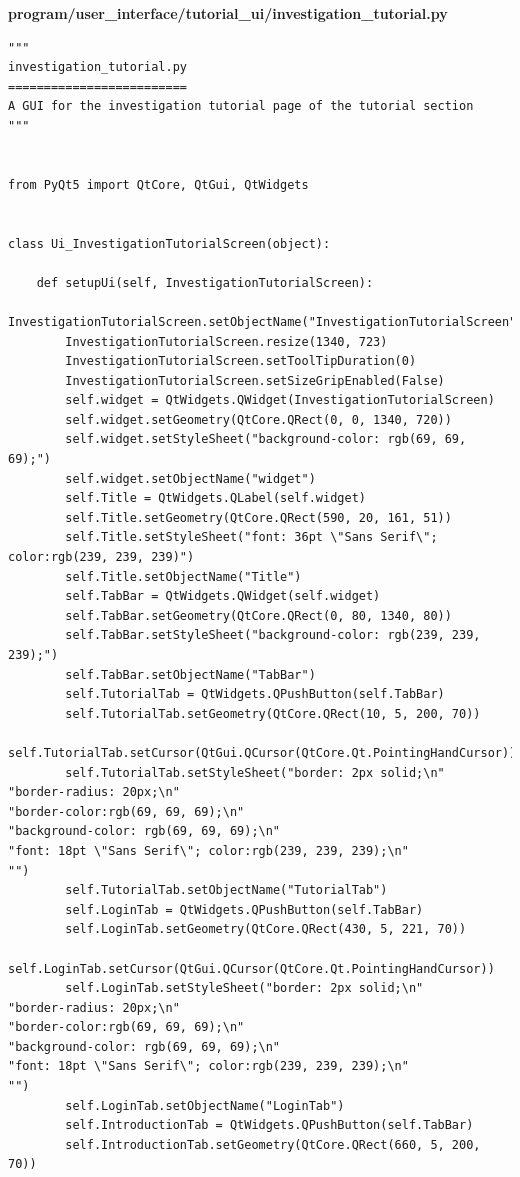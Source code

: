\documentclass{article}
\begin{document}
\textbf{program/user\_interface/tutorial\_ui/investigation\_tutorial.py}

\begin{lstlisting}
"""
investigation_tutorial.py
=========================
A GUI for the investigation tutorial page of the tutorial section
"""


from PyQt5 import QtCore, QtGui, QtWidgets


class Ui_InvestigationTutorialScreen(object):

    def setupUi(self, InvestigationTutorialScreen):
        InvestigationTutorialScreen.setObjectName("InvestigationTutorialScreen")
        InvestigationTutorialScreen.resize(1340, 723)
        InvestigationTutorialScreen.setToolTipDuration(0)
        InvestigationTutorialScreen.setSizeGripEnabled(False)
        self.widget = QtWidgets.QWidget(InvestigationTutorialScreen)
        self.widget.setGeometry(QtCore.QRect(0, 0, 1340, 720))
        self.widget.setStyleSheet("background-color: rgb(69, 69, 69);")
        self.widget.setObjectName("widget")
        self.Title = QtWidgets.QLabel(self.widget)
        self.Title.setGeometry(QtCore.QRect(590, 20, 161, 51))
        self.Title.setStyleSheet("font: 36pt \"Sans Serif\"; color:rgb(239, 239, 239)")
        self.Title.setObjectName("Title")
        self.TabBar = QtWidgets.QWidget(self.widget)
        self.TabBar.setGeometry(QtCore.QRect(0, 80, 1340, 80))
        self.TabBar.setStyleSheet("background-color: rgb(239, 239, 239);")
        self.TabBar.setObjectName("TabBar")
        self.TutorialTab = QtWidgets.QPushButton(self.TabBar)
        self.TutorialTab.setGeometry(QtCore.QRect(10, 5, 200, 70))
        self.TutorialTab.setCursor(QtGui.QCursor(QtCore.Qt.PointingHandCursor))
        self.TutorialTab.setStyleSheet("border: 2px solid;\n"
"border-radius: 20px;\n"
"border-color:rgb(69, 69, 69);\n"
"background-color: rgb(69, 69, 69);\n"
"font: 18pt \"Sans Serif\"; color:rgb(239, 239, 239);\n"
"")
        self.TutorialTab.setObjectName("TutorialTab")
        self.LoginTab = QtWidgets.QPushButton(self.TabBar)
        self.LoginTab.setGeometry(QtCore.QRect(430, 5, 221, 70))
        self.LoginTab.setCursor(QtGui.QCursor(QtCore.Qt.PointingHandCursor))
        self.LoginTab.setStyleSheet("border: 2px solid;\n"
"border-radius: 20px;\n"
"border-color:rgb(69, 69, 69);\n"
"background-color: rgb(69, 69, 69);\n"
"font: 18pt \"Sans Serif\"; color:rgb(239, 239, 239);\n"
"")
        self.LoginTab.setObjectName("LoginTab")
        self.IntroductionTab = QtWidgets.QPushButton(self.TabBar)
        self.IntroductionTab.setGeometry(QtCore.QRect(660, 5, 200, 70))

\end{lstlisting}
\end{document}
